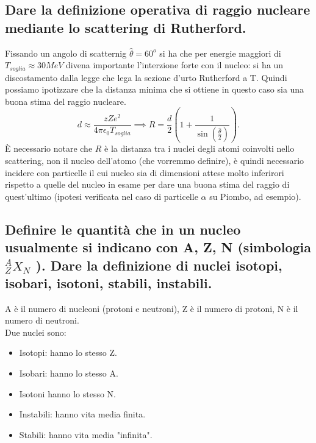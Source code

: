 \subsection[$\ $ Definizione di raggio nucleare tramite lo Scattering Rutherford]{Dare la definizione operativa di raggio nucleare mediante lo scattering di Rutherford.}
Fissando un angolo di scatternig $\hat{\theta} = 60^o$ si ha che per energie maggiori di $T_{soglia} \approx 30 MeV$ divena importante l'interzione forte con il nucleo: si ha un discostamento dalla legge che lega la sezione d'urto Rutherford a T. Quindi possiamo ipotizzare che la distanza minima che si ottiene in questo caso sia una buona stima del raggio nucleare.
\[
	d \approx \frac{zZ e^2}{4 \pi \epsilon_0 T_{soglia}} \implies R = \frac{d}{2}\left( 1 + \frac{1}{\sin\left( \frac{\hat{\theta}}{2} \right) } \right) 
.\] 
È necessario notare che $R$ è la distanza tra i nuclei degli atomi coinvolti nello scattering, non il nucleo dell'atomo (che vorremmo definire), è quindi necessario incidere con particelle il cui nucleo sia di dimensioni attese molto inferirori rispetto a quelle del nucleo in esame per dare una buona stima del raggio di quest'ultimo (ipotesi verificata nel caso di particelle $\alpha$ su Piombo, ad esempio).

\subsection[$\ $ Definizione di A, Z, N, nuclei isotopi, isobari, isotoni, stabili ed instabili]{Definire le quantità che in un nucleo usualmente si indicano con A, Z, N (simbologia ${}^A_Z X_N$ ). Dare la definizione di nuclei isotopi, isobari, isotoni, stabili, instabili.}
A è il numero di nucleoni (protoni e neutroni), Z è il numero di protoni, N è il numero di neutroni.\\
Due nuclei sono:
\begin{itemize}
	\item Isotopi: hanno lo stesso Z.
	\item Isobari: hanno lo stesso A.
	\item Isotoni hanno lo stesso N.
	\item Instabili: hanno vita media finita.
	\item Stabili: hanno vita media "infinita".
\end{itemize}

